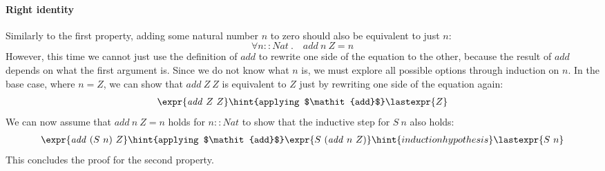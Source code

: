 \paragraph{Right identity} Similarly to the first property, adding some natural number $n$ to zero should also be equivalent to just $n$:
\begin{displaymath}
\forall n :: \mathit{Nat} ~.\quad \mathit{add}~n~Z = n
\end{displaymath}
However, this time we cannot just use the definition of $\mathit{add}$ to rewrite one side of the equation to the other, because the result of $\mathit{add}$ depends on what the first argument is. Since we do not know what $n$ is, we must explore all possible options through induction on $n$. In the base case, where $n = Z$, we can show that $\mathit{add}~Z~Z$ is equivalent to $Z$ just by rewriting one side of the equation again:
\begin{align*}
\expr{\mathit{add}~Z~Z}
\hint{applying $\mathit{add}$}
\lastexpr{Z}
\end{align*}
We can now assume that $\mathit{add}~n~Z = n$ holds for $n :: \mathit{Nat}$ to show that the inductive step for $S~n$ also holds:
\begin{align*}
\expr{\mathit{add}~(S~n)~Z}
\hint{applying $\mathit{add}$}
\expr{S~(\mathit{add}~n~Z)}
\hint{induction hypothesis}
\lastexpr{S~n}
\end{align*}
This concludes the proof for the second property. 

